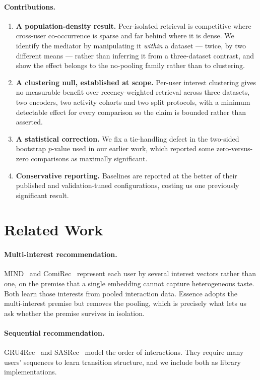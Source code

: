 \documentclass[runningheads]{llncs}
\begin{document}
\paragraph{Contributions.}
\begin{enumerate}
\item \textbf{A population-density result.} Peer-isolated retrieval is competitive where
cross-user co-occurrence is sparse and far behind where it is dense. We identify the
mediator by manipulating it \emph{within} a dataset --- twice, by two different means ---
rather than inferring it from a three-dataset contrast, and show the effect belongs to the
no-pooling family rather than to clustering.
\item \textbf{A clustering null, established at scope.} Per-user interest clustering gives
no measurable benefit over recency-weighted retrieval across three datasets, two encoders,
two activity cohorts and two split protocols, with a minimum detectable effect for every
comparison so the claim is bounded rather than asserted.
\item \textbf{A statistical correction.} We fix a tie-handling defect in the two-sided
bootstrap $p$-value used in our earlier work, which reported some zero-versus-zero
comparisons as maximally significant.
\item \textbf{Conservative reporting.} Baselines are reported at the better of their
published and validation-tuned configurations, costing us one previously significant
result.
\end{enumerate}

\section{Related Work}

\paragraph{Multi-interest recommendation.} MIND~\cite{li2019mind} and
ComiRec~\cite{cen2020controllable} represent each user by several interest vectors rather
than one, on the premise that a single embedding cannot capture heterogeneous taste. Both
learn those interests from pooled interaction data. Essence adopts the multi-interest
premise but removes the pooling, which is precisely what lets us ask whether the premise
survives in isolation.

\paragraph{Sequential recommendation.} GRU4Rec~\cite{hidasi2016session} and
SASRec~\cite{kang2018self} model the order of interactions. They require many users'
sequences to learn transition structure, and we include both as library implementations.
\end{document}
